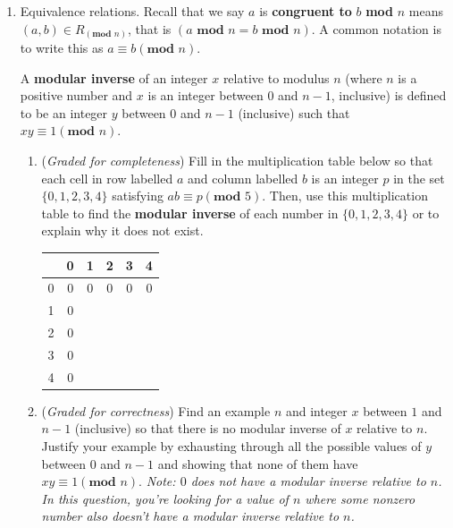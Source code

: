 \documentclass[12pt, oneside]{article}
\newcommand{\gradeCorrect}{({\it Graded for correctness}) }
\newcommand{\gradeComplete}{({\it Graded for completeness}) }
\begin{document}
\begin{enumerate}[labelindent=0pt, leftmargin=0pt]
    \item Equivalence relations.  Recall that we say $a$ is {\bf congruent to} $b$ \textbf{mod} $n$ 
    means $(a, b) \in R_{(\textbf{mod } n)}$, that is $(a \textbf{ mod } n = b \textbf{ mod } n)$.
    A common notation is to write this as $a \equiv b (\textbf{mod } n)$.
    
    A {\bf modular inverse} of an integer $x$ relative to modulus $n$ (where $n$ 
    is a positive number and $x$ is an integer between $0$ and $n-1$, inclusive) 
    is defined to be an integer $y$ between $0$ and $n-1$ (inclusive) such that 
    $xy \equiv 1 (\textbf{mod } n)$.
    \begin{enumerate}
        \item\gradeComplete Fill in the multiplication table below so that each  cell in 
        row labelled $a$ and column labelled $b$ is an integer $p$ in the set $\{0, 1, 2, 3, 4\}$
        satisfying $ab \equiv p ({\textbf{mod } 5})$.
        Then, use this multiplication table to find the {\bf modular inverse}
        of each number in $\{0,1,2,3,4\}$ or to explain why it does not exist.

        \begin{center}
            \begin{tabular}{|c||c|c|c|c|c|}
                \hline
                  & 0 & 1 & 2 & 3 & 4 \\
                  \hline \hline
                0 & 0 & 0 & 0 & 0 & 0 \\
                \hline
                1 & 0 & ~ & ~ & ~ & ~ \\
                \hline
                2 & 0 & ~ & ~ & ~ & ~ \\
                \hline
                3 & 0 & ~ & ~ & ~ & ~ \\
                \hline
                4 & 0 & ~ & ~ & ~ & ~ \\
                \hline
            \end{tabular}
        \end{center}

        \item\gradeCorrect Find an example $n$ and integer $x$ between $1$ and $n-1$ (inclusive)
        so that there is no modular inverse of $x$ relative to $n$. Justify your example by 
        exhausting through all the possible values of $y$ between $0$ and $n-1$ and showing that 
        none of them have $xy \equiv 1 (\textbf{mod } n)$.  {\it Note: $0$ does not have a modular 
        inverse relative to $n$. In this question, you're looking for a value of $n$ where some nonzero 
        number also doesn't have a modular inverse relative to $n$.}
    \end{enumerate}
    



\end{enumerate}
\end{document}
